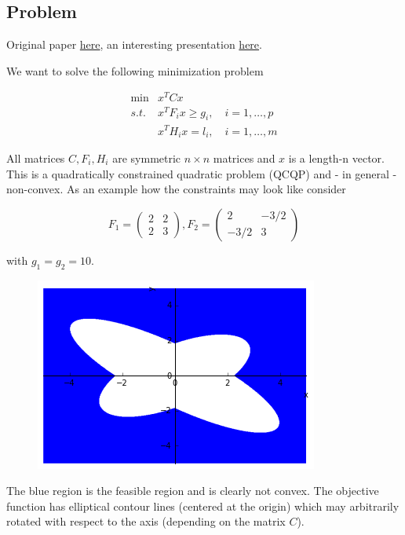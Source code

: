 
\subsection{Problem}

Original paper \href{\%7Bfilename\%7D/files/sdrapp-SPM.pdf}{here}, an
interesting presentation
\href{\%7Bfilename\%7D/files/20120616101847.pdf}{here}.

We want to solve the following minimization problem


\begin{align*}
\min & x^T C x \\
s.t. & x^T F_i x \geq g_i, \quad i=1,\ldots,p \\
     & x^T H_i x = l_i, \quad i=1,\ldots,m
\end{align*}


All matrices \(C, F_i, H_i\) are symmetric \(n \times n\) matrices and \(x\) is a length-n vector. This is a quadratically constrained quadratic problem (QCQP) and - in general - non-convex. As an example how the constraints may look like consider

\[ F_1 = 
\begin{pmatrix}
2 & 2 \\
2 & 3
\end{pmatrix}, F_2 = 
\begin{pmatrix}
2 & -3/2 \\
-3/2 & 3
\end{pmatrix}
\]

with \(g_1 = g_2 = 10\).

\begin{figure}[H]
\centering
\includegraphics{images/sdr_1.png}
\end{figure}

The blue region is the feasible region and is clearly not convex. The objective function has elliptical contour lines (centered at the origin) which may arbitrarily rotated with respect to the axis (depending on the matrix \(C\)).

